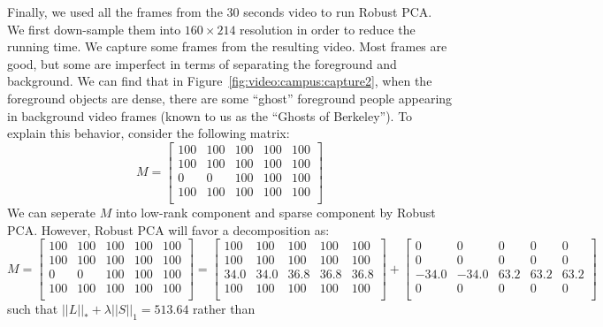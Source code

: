 Finally, we used all the frames from the 30 seconds video to run Robust PCA. We first down-sample them into $160\times214$ resolution in order to reduce the running time. We capture some frames from the resulting video. Most frames are good, but some are imperfect in terms of separating the foreground and background. We can find that in Figure~\ref{fig:video:campus:capture2}, when the foreground objects are dense, there are some ``ghost'' foreground people appearing in background video frames (known to us as the ``Ghosts of Berkeley''). To explain this behavior, consider the following matrix:
\[
 M =
 \begin{bmatrix}
  100 & 100 & 100 & 100 & 100 \\
  100 & 100 & 100 & 100 & 100 \\
  0 & 0 & 100 & 100 & 100 \\
  100 & 100 & 100 & 100 & 100 \\
 \end{bmatrix}
\]
We can seperate $M$ into low-rank component and sparse component by Robust PCA. However, Robust PCA will favor a decomposition as:
\[
 M =
 \begin{bmatrix}
  100  & 100  & 100  & 100  & 100 \\
  100  & 100  & 100  & 100  & 100 \\
  0     &  0      & 100  & 100  & 100 \\
  100  & 100  & 100  & 100  & 100 \\
 \end{bmatrix}
 =
 \begin{bmatrix}
  100  & 100  & 100  & 100  & 100 \\
  100  & 100  & 100  & 100  & 100 \\
   34.0   & 34.0   & 36.8   & 36.8   & 36.8   \\
  100  & 100  & 100  & 100  & 100 \\
 \end{bmatrix}
 +
 \begin{bmatrix}
          0    &      0   &       0     &     0    &      0 \\
         0    &      0    &      0    &      0    &      0 \\
  -34.0  & -34.0   & 63.2   & 63.2   & 63.2 \\
         0    &      0   &       0     &     0     &     0 \\
 \end{bmatrix}
\]
such that $||L||_{*} + \lambda||S||_{1}  = 513.64$ 
rather than 
